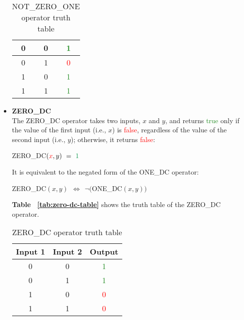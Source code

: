 \documentclass[]{usiinfbachelorproject}
\begin{document}
\begin{itemize}
\begin{table}[H]
\begin{tabular}{|c|c|c|}
                0 & 0 & \textcolor{ForestGreen}{1} \\ 
                \hline
                0 & 1 & \textcolor{red}{0} \\
                \hline
                1 & 0 & \textcolor{ForestGreen}{1} \\
                \hline
                1 & 1 & \textcolor{ForestGreen}{1} \\ 
                \hline
            \end{tabular}
            \caption{NOT\_ZERO\_ONE operator truth table}
            \label{tab:not-zero-one-table}
        \end{table}
    \item \textbf{ZERO\_DC}
        \vspace{0.2cm} \\
        The ZERO\_DC operator takes two inputs, $x$ and $y$, and returns \textcolor{ForestGreen}{true} only if the value of the first input (i.e., $x$) is \textcolor{red}{false}, regardless of the value of the second input (i.e., $y$); otherwise, it returns \textcolor{red}{false}:
        \begin{center}
            ZERO\_DC$(\textcolor{red}{x}, y) \ =\ \textcolor{ForestGreen}{1}$
        \end{center}
        It is equivalent to the negated form of the ONE\_DC operator:
        \begin{center}
            ZERO\_DC$(x,y) \ \ \Longleftrightarrow \ \ \neg($ONE\_DC$(x,y))$
        \end{center}
        \textbf{Table ~\ref{tab:zero-dc-table}} shows the truth table of the ZERO\_DC operator.
        \begin{table}[H]
            \centering
            \begin{tabular}{|c|c|c|}
                \hline
                \textbf{Input 1} & \textbf{Input 2} & \textbf{Output} \\
                \hline
                0 & 0 & \textcolor{ForestGreen}{1} \\
                \hline
                0 & 1 & \textcolor{ForestGreen}{1} \\
                \hline
                1 & 0 & \textcolor{red}{0} \\
                \hline
                1 & 1 & \textcolor{red}{0} \\
                \hline
            \end{tabular}
            \caption{ZERO\_DC operator truth table}

\end{table}
\end{itemize}
\end{document}
